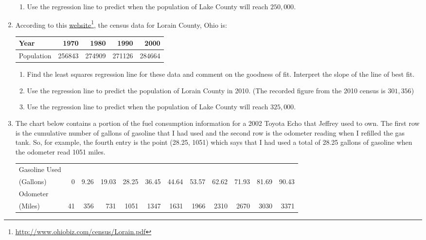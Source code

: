 \documentclass{ximera}
\begin{document}
\begin{enumerate}
\begin{enumerate}
\item  Use the regression line to predict when the population of Lake County will reach $250,\!000$.

\end{enumerate}


\item According to this \href{http://www.ohiobiz.com/census/Lorain.pdf}{\underline{website}}\footnote{\href{http://www.ohiobiz.com/census/Lorain.pdf}{\underline{http://www.ohiobiz.com/census/Lorain.pdf}}}, the census data for Lorain County, Ohio is:

\noindent \begin{tabular}{|l|r|r|r|r|} \hline
Year & 1970 & 1980 & 1990 & 2000 \\
\hline
Population & 256843 & 274909 & 271126 & 284664 \\ \hline
\end{tabular}

\begin{enumerate}


\item  Find the least squares regression line for these data and comment on the goodness of fit. Interpret the slope of the line of best fit.

\item  Use the regression line to predict the population of Lorain County in 2010.  (The recorded figure from the 2010 census is $301,\!356$)

\item  Use the regression line to predict when the population of Lake County will reach $325,\!000$.

\end{enumerate}

\item The chart below contains a portion of the fuel consumption information for a 2002 Toyota Echo that Jeffrey used to own.  The first row is the cumulative number of gallons of gasoline that I had used and the second row is the odometer reading when I refilled the gas tank.  So, for example, the fourth entry is the point (28.25, 1051) which says that I had used a total of 28.25 gallons of gasoline when the odometer read 1051 miles.

\medskip



\noindent \begin{tabular}{|l|r|r|r|r|r|r|r|r|r|r|r|} \hline
Gasoline Used & & & & & & & & & & & \\
(Gallons)  & 0 & 9.26 & 19.03 & 28.25 & 36.45 & 44.64 & 53.57 & 62.62 & 71.93 & 81.69 & 90.43\\
\hline
Odometer & & & & & & & & & & & \\
(Miles) & 41 & 356 & 731 & 1051 & 1347 & 1631 & 1966 & 2310 & 2670 & 3030 & 3371\\ \hline
\end{tabular}


\end{enumerate}
\end{document}
